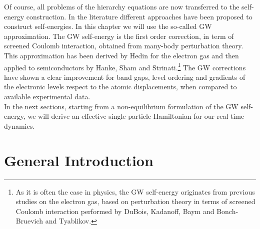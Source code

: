 Of course, all problems of the hierarchy equations are now transferred to the self-energy construction.
In the literature different approaches have been proposed to construct self-energies. In this chapter we will use the so-called GW approximation. The GW self-energy is the first order correction, in term of screened Coulomb interaction, obtained from many-body perturbation theory\cite{aryasetiawan1998gw}. This approximation has been derived by Hedin\cite{hedin1999correlation} for the electron gas and then applied to semiconductors by Hanke, Sham and Strinati\cite{PhysRevB.25.2867}.\footnote{As it is often the case in  physics, the GW self-energy originates from previous studies on the electron gas, based on perturbation theory in terms of screened Coulomb interaction performed by DuBois, Kadanoff, Baym and Bonch-Bruevich and Tyablikov.} The GW corrections have shown a  clear  improvement for band gaps\cite{aryasetiawan1998gw,Aulbur19991}, level ordering\cite{faber2011first} and gradients of the electronic levels respect to the atomic displacements\cite{faber2015exploring}, when compared to available experimental data.\\
In the next sections, starting from a non-equilibrium formulation of the GW self-energy\cite{PhysRevB.69.205204}, we will derive an effective single-particle Hamiltonian for our real-time dynamics. 

\section{General Introduction}

